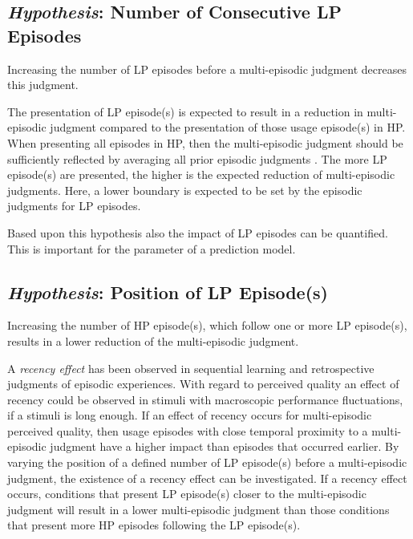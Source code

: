 {\subsection{\emph{Hypothesis}: Number of Consecutive \acs{LP} Episodes}
\begin{hypothesis}\label{hypo:number}
Increasing the number of \ac{LP} episodes before a multi-episodic judgment decreases this judgment.
\end{hypothesis}

The presentation of \ac{LP} episode(s) is expected to result in a reduction in multi-episodic judgment compared to the presentation of those usage episode(s) in \ac{HP}.
When presenting all episodes in \ac{HP}, then the multi-episodic judgment should be sufficiently reflected by averaging all prior episodic judgments \citep[\cf,][]{moller_single-call_2011}.
The more \ac{LP} episode(s) are presented, the higher is the expected reduction of multi-episodic judgments.
Here, a lower boundary is expected to be set by the episodic judgments for \ac{LP} episodes.

Based upon this hypothesis also the impact of \ac{LP} episodes can be quantified.
This is important for the parameter of a prediction model.


\subsection{\emph{Hypothesis}: Position of \acs{LP} Episode(s)}
\begin{hypothesis}\label{hypo:position}
Increasing the number of \ac{HP} episode(s), which follow one or more \ac{LP} episode(s), results in a lower reduction of the multi-episodic judgment.
\end{hypothesis}

A \emph{recency effect} has been observed in sequential learning and retrospective judgments of episodic experiences.
With regard to perceived quality an effect of recency could be observed in stimuli with macroscopic performance fluctuations, if a stimuli is long enough.
If an effect of recency occurs for multi-episodic perceived quality, then usage episodes with close temporal proximity to a multi-episodic judgment have a higher impact than episodes that occurred earlier.
By varying the position of a defined number of \ac{LP} episode(s) before a multi-episodic judgment, the existence of a recency effect can be investigated.
If a recency effect occurs, conditions that present \ac{LP} episode(s) closer to the multi-episodic judgment will result in a lower multi-episodic judgment than those conditions that present more \ac{HP} episodes following the \ac{LP} episode(s).

}
